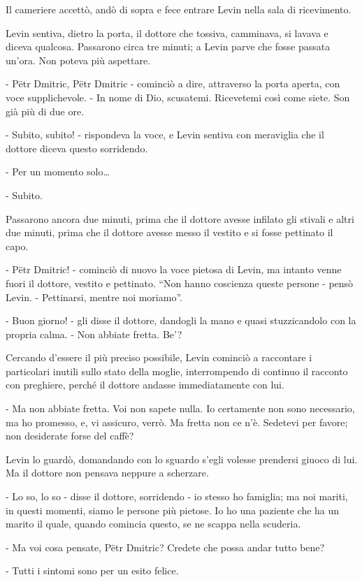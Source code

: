Il cameriere accettò, andò di sopra e fece entrare Levin nella sala di ricevimento. 

Levin sentiva, dietro la porta, il dottore che tossiva, camminava, si lavava e diceva qualcosa. Passarono circa tre minuti; a Levin parve che fosse passata un'ora. Non poteva più aspettare. 

- Pëtr Dmitric, Pëtr Dmitric - cominciò a dire, attraverso la porta aperta, con voce supplichevole. - In nome di Dio, scusatemi. Ricevetemi così come siete. Son già più di due ore. 

- Subito, subito! - rispondeva la voce, e Levin sentiva con meraviglia che il dottore diceva questo sorridendo. 

- Per un momento solo\ldots{} 

- Subito. 

Passarono ancora due minuti, prima che il dottore avesse infilato gli stivali e altri due minuti, prima che il dottore avesse messo il vestito e si fosse pettinato il capo. 

- Pëtr Dmitric! - cominciò di nuovo la voce pietosa di Levin, ma intanto venne fuori il dottore, vestito e pettinato. ``Non hanno coscienza queste persone - pensò Levin. - Pettinarsi, mentre noi moriamo''. 

- Buon giorno! - gli disse il dottore, dandogli la mano e quasi stuzzicandolo con la propria calma. - Non abbiate fretta. Be'? 

Cercando d'essere il più preciso possibile, Levin cominciò a raccontare i particolari inutili sullo stato della moglie, interrompendo di continuo il racconto con preghiere, perché il dottore andasse immediatamente con lui. 

- Ma non abbiate fretta. Voi non sapete nulla. Io certamente non sono necessario, ma ho promesso, e, vi assicuro, verrò. Ma fretta non ce n'è. Sedetevi per favore; non desiderate forse del caffè? 

Levin lo guardò, domandando con lo sguardo s'egli volesse prendersi giuoco di lui. Ma il dottore non pensava neppure a scherzare. 

- Lo so, lo so - disse il dottore, sorridendo - io stesso ho famiglia; ma noi mariti, in questi momenti, siamo le persone più pietose. Io ho una paziente che ha un marito il quale, quando comincia questo, se ne scappa nella scuderia. 

- Ma voi cosa pensate, Pëtr Dmitric? Credete che possa andar tutto bene? 

- Tutti i sintomi sono per un esito felice. 

